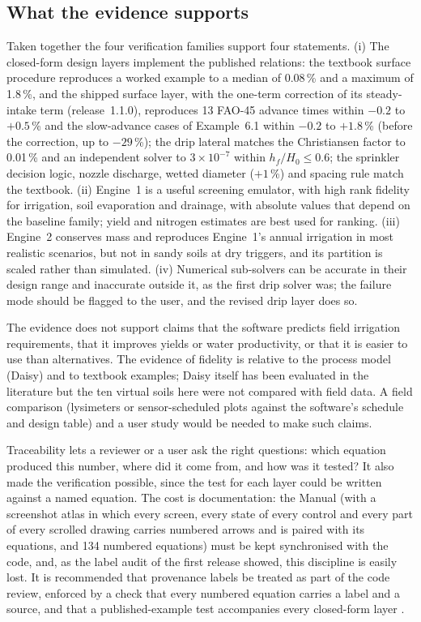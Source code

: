 \documentclass[preprint,12pt]{elsarticle}
\begin{document}
\subsection{What the evidence supports}
Taken together the four verification families support four statements. (i) The closed-form design layers implement the published relations: the textbook surface procedure reproduces a worked example to a median of 0.08\,\% and a maximum of 1.8\,\%, and the shipped surface layer, with the one-term correction of its steady-intake term (release~1.1.0), reproduces 13 FAO-45 advance times within $-0.2$ to $+0.5$\,\% and the slow-advance cases of Example~6.1 within $-0.2$ to $+1.8$\,\% (before the correction, up to $-29$\,\%); the drip lateral matches the Christiansen factor to 0.01\,\% and an independent solver to $3\times10^{-7}$ within $h_f/H_0\le0.6$; the sprinkler decision logic, nozzle discharge, wetted diameter ($+1$\,\%) and spacing rule match the textbook. (ii) Engine~1 is a useful screening emulator, with high rank fidelity for irrigation, soil evaporation and drainage, with absolute values that depend on the baseline family; yield and nitrogen estimates are best used for ranking. (iii) Engine~2 conserves mass and reproduces Engine~1's annual irrigation in most realistic scenarios, but not in sandy soils at dry triggers, and its partition is scaled rather than simulated. (iv) Numerical sub-solvers can be accurate in their design range and inaccurate outside it, as the first drip solver was; the failure mode should be flagged to the user, and the revised drip layer does so.

The evidence does not support claims that the software predicts field irrigation requirements, that it improves yields or water productivity, or that it is easier to use than alternatives. The evidence of fidelity is relative to the process model (Daisy) and to textbook examples; Daisy itself has been evaluated in the literature \cite{Hansen2012,Holbak2026} but the ten virtual soils here were not compared with field data. A field comparison (lysimeters or sensor-scheduled plots against the software's schedule and design table) and a user study would be needed to make such claims.

Traceability lets a reviewer or a user ask the right questions: which equation produced this number, where did it come from, and how was it tested? It also made the verification possible, since the test for each layer could be written against a named equation. The cost is documentation: the Manual (with a screenshot atlas in which every screen, every state of every control and every part of every scrolled drawing carries numbered arrows and is paired with its equations, and 134 numbered equations) must be kept synchronised with the code, and, as the label audit of the first release showed, this discipline is easily lost. It is recommended that provenance labels be treated as part of the code review, enforced by a check that every numbered equation carries a label and a source, and that a published-example test accompanies every closed-form layer \cite{Jakeman2006,Refsgaard2004}.
\end{document}
